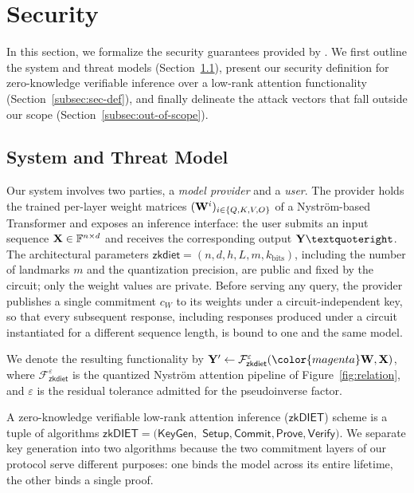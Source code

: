 \documentclass[sigconf,anonymous,review,balance=false]{acmart}
\newcommand{\rev}[1]{{\color{magenta}#1}}
\begin{document}
\section{Security}
\label{sec:security}

In this section, we formalize the security guarantees provided by \name. We first outline the system and threat models (Section~\ref{subsec:threat-model}), present our security definition for zero-knowledge verifiable inference over a low-rank attention functionality (Section~\ref{subsec:sec-def}), and finally delineate the attack vectors that fall outside our scope (Section~\ref{subsec:out-of-scope}).

\subsection{System and Threat Model}
\label{subsec:threat-model}

Our system involves two parties, a \emph{model provider} and a \emph{user}. The provider holds the trained per-layer weight matrices \rev{$({\mathbf{W}}^i)_{i \in \{Q,K,V,O\}}$} of a Nystr\"om-based Transformer and exposes an inference interface: the user submits an input sequence ${\mathbf{X}} \in \mathbb{F}^{n \times d}$ and receives the corresponding output $\Y’$. The architectural parameters $\mathsf{zkdiet} = (n, d, h, L, m, k_{\mathrm{bits}})$, including the number of landmarks $m$ and the quantization precision, are public and fixed by the circuit; only the weight values are private. Before serving any query, the provider publishes a single commitment $c_{W}$ to its weights under a \rev{circuit-independent} key, so that every subsequent response, including responses produced under a circuit instantiated for a different sequence length, is bound to one and the same model.

We denote the resulting functionality by $\Y' \leftarrow \mathcal{F}^{\varepsilon}_{\mathsf{zkdiet}}(\rev{\W}, \X)$, where $\mathcal{F}^{\varepsilon}_{\mathsf{zkdiet}}$ is the quantized Nystr\"om attention pipeline of Figure~\ref{fig:relation}, and $\varepsilon$ is the residual tolerance admitted for the pseudoinverse factor. 

A zero-knowledge verifiable low-rank attention inference ($\mathsf{zkDIET}$) scheme is a tuple of algorithms $\mathsf{zkDIET} = (\mathsf{KeyGen},$ $\mathsf{Setup}, \mathsf{Commit}, \mathsf{Prove}, \mathsf{Verify})$. We separate key generation into two algorithms because the two commitment layers of our protocol serve different purposes: one binds the model across its entire lifetime, the other binds a single proof.
\end{document}
